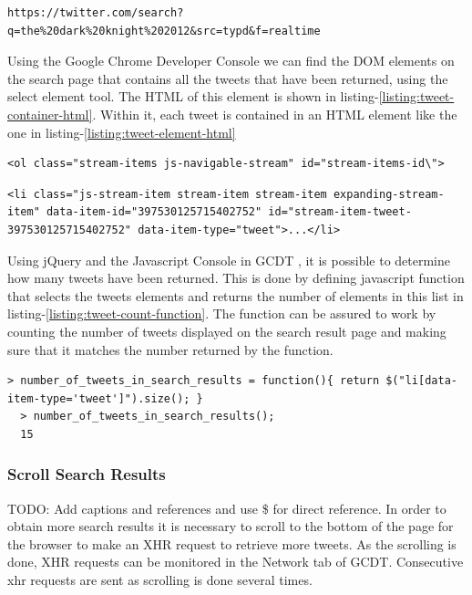 \begin{lstlisting}[caption={URL of a twitter HTTPS search request for "The Dark Knight Rises 2012" parsed to URLE},label={listing:search-request-batman-urle},captionpos=b]
  https://twitter.com/search?q=the%20dark%20knight%202012&src=typd&f=realtime
  \end{lstlisting}

Using the Google Chrome Developer Console \cite{gcdt} we can find the DOM elements on the search page that contains all the tweets that have been returned, using the select element tool. The HTML of this element is shown in listing-\ref{listing:tweet-container-html}. Within it, each tweet is contained in an HTML element like the one in listing-\ref{listing:tweet-element-html}

  \begin{lstlisting}[caption={HTML of the element containing all tweet elements},label={listing:tweet-container-html},captionpos=b]
  <ol class="stream-items js-navigable-stream" id="stream-items-id\">
  \end{lstlisting}

  \begin{lstlisting}[caption={HTML of a tweet element},label={listing:tweet-element-html},captionpos=b]
  <li class="js-stream-item stream-item stream-item expanding-stream-item" data-item-id="397530125715402752" id="stream-item-tweet-397530125715402752" data-item-type="tweet">...</li>
  \end{lstlisting}

Using jQuery \cite{jquery} and the Javascript Console in GCDT \cite{gcdt}, it is possible to determine how many tweets have been returned. This is done by defining javascript function that selects the tweets elements and returns the number of elements in this list in listing-\ref{listing:tweet-count-function}. The function can be assured to work by counting the number of tweets displayed on the search result page and making sure that it matches the number returned by the function.

  \begin{lstlisting}[caption={Creating a function in GCDT Javascript Console for counting the occurance of tweets on the twitter search result page},label={listing:tweet-count-function},captionpos=b]
  > number_of_tweets_in_search_results = function(){ return $("li[data-item-type='tweet']").size(); }
  > number_of_tweets_in_search_results();
  15
  \end{lstlisting}

\subsubsection{Scroll Search Results}
TODO: Add captions and references and use \$ for direct reference.
In order to obtain more search results it is necessary to scroll to the bottom of the page for the browser to make an XHR request to retrieve more tweets. As the scrolling is done, XHR requests can be monitored in the Network tab of GCDT. Consecutive xhr requests are sent as scrolling is done several times.

